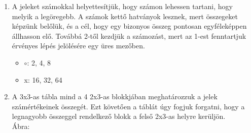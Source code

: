 \documentclass[a4paper, 11pt]{article}
\begin{document}
\begin{enumerate}
    \item A jeleket számokkal helyettesítjük, hogy számon lehessen tartani, hogy melyik a legöregebb. A számok kettő hatványok lesznek, mert összegeket képzünk belőlük, és a cél, hogy egy bizonyos összeg pontosan egyféleképpen állhasson elő. Továbbá 2-től kezdjük a számozást, mert az 1-est fenntartjuk érvényes lépés jelölésére egy üres mezőben.
        \begin{itemize}
            \item $\circ$: 2, 4, 8
            \item x: 16, 32, 64
        \end{itemize}

    \pagebreak
    \item A 3x3-as tábla mind a 4 2x3-as blokkjában meghatározzuk a jelek számértékeinek összegét. Ezt követően a táblát úgy fogjuk forgatni, hogy a legnagyobb összeggel rendelkező blokk a felső 2x3-as helyre kerüljön.\\
    Ábra:
        \begin{center}
        \end{center}
        

\end{enumerate}
\end{document}
